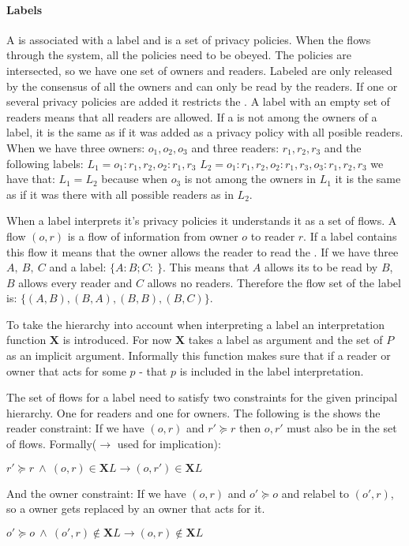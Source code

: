 \paragraph{Labels}
A \xvalue{} is associated with a label and is a set of privacy policies.
When the \xvalue{} flows through the system, all the policies need to be obeyed.
The policies are intersected, so we have one set of owners and readers.
Labeled \xvalues{} are only released by the consensus of all the owners and can only be read by the readers.
If one or several privacy policies are added it restricts the \xvalue{}.
A label with an empty set of readers means that all readers are allowed.
If a \principal is not among the owners of a label, it is the same as if it was added as a privacy policy with all posible readers.
When we have three owners: $o_1, o_2, o_3$ and three readers: $r_1, r_2, r_3$ and the following labels:
$L_1 = {o_1: r_1,r_2, o_2: r_1, r_3}$ $L_2 = {o_1: r_1,r_2, o_2: r_1, r_3, o_3: r_1, r_2, r_3}$ we have that: $L_1 = L_2$ because when $o_3$ is not among the owners in $L_1$ it is the same as if it was there with all possible readers as in $L_2$.


When a label interprets it's privacy policies it understands it as a set of flows.
A flow $(o,r)$ is a flow of information from owner $o$ to reader $r$.
If a label contains this flow it means that the owner allows the reader to read the \xvalue{}.
If we have three \principals{} $A,\ B,\ C$ and a label: $\{A: B; C: \ \}$.
This means that $A$ allows its \xvalue{} to be read by $B$, $B$ allows every reader and $C$ allows no readers.
Therefore the flow set of the label is: $\{(A,B), (B,A), (B,B), (B,C) \}$.


To take the \principal{} hierarchy into account when interpreting a label an interpretation function $\textbf{X}$ is introduced.
For now $\textbf{X}$ takes a label as argument and the set of \principals{} $P$ as an implicit argument.
Informally this function makes sure that if a reader or owner that acts for some \principal{} $p$ - that $p$ is included in the label interpretation.


The set of flows for a label need to satisfy two constraints for the given principal hierarchy.
One for readers and one for owners.
The following is the shows the reader constraint:
If we have $(o,r)$ and $r' \succeq r$ then $o,r'$ must also be in the set of flows.
Formally($\rightarrow$ used for implication):
\begin{center}
  $r' \succeq r \ \wedge \ (o,r) \in \textbf{X}L \rightarrow (o,r') \in \textbf{X}L$
\end{center}
And the owner constraint:
If we have $(o,r)$ and $o' \succeq o$ and relabel to $(o',r)$, so a owner gets replaced by an owner that acts for it.
\begin{center}
  $o' \succeq o \ \wedge \ (o',r) \notin \textbf{X}L \rightarrow (o,r) \notin \textbf{X}L$
\end{center}

